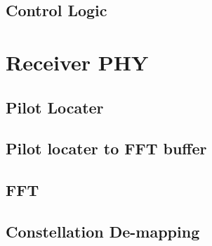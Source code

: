 \documentclass[10pt]{article}
\begin{document}
	\subsection{Control Logic}
	\label{sec:ctrl}

\section{Receiver PHY}
	\subsection{Pilot Locater}

	\subsection{Pilot locater to FFT buffer}

	\subsection{FFT}

	\subsection{Constellation De-mapping}

\end{document}
